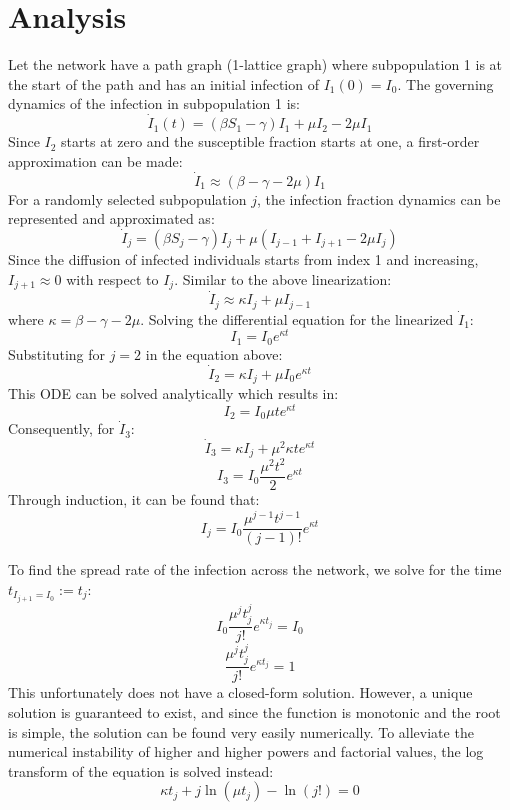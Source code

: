 \section*{Analysis}

\begin{center}
\end{center}

Let the network have a path graph (1-lattice graph) where subpopulation 1 is at the start of the path and has an initial infection of $I_1(0)=I_0$. The governing dynamics of the infection in subpopulation 1 is:
$$
\dot I_1(t)=(\beta S_1-\gamma)I_1+\mu I_2-2\mu I_1
$$
Since $I_2$ starts at zero and the susceptible fraction starts at one, a first-order approximation can be made:
$$
\dot I_1 \approx (\beta-\gamma-2\mu)I_1
$$
For a randomly selected subpopulation $j$, the infection fraction dynamics can be represented and approximated as:
$$
\dot I_j =(\beta S_j-\gamma)I_j+\mu (I_{j-1}+I_{j+1}-2\mu I_j)
$$
Since the diffusion of infected individuals starts from index 1 and increasing, $I_{j+1} \approx 0$ with respect to $I_j$. Similar to the above linearization:
$$
\dot I_j \approx \kappa I_j+\mu I_{j-1}
$$
where $\kappa = \beta-\gamma-2\mu$. Solving the differential equation for the linearized $\dot I_1$:
$$
I_1 = I_0 e^{\kappa t}
$$
Substituting for $j=2$ in the equation above:
$$
\dot I_2=\kappa I_j +\mu I_0 e^{\kappa t}
$$
This ODE can be solved analytically which results in:
$$
I_2=I_0 \mu t e^{\kappa t}  
$$
Consequently, for $\dot I_3$:
$$
\dot I_3=\kappa I_j +\mu^2 \kappa t e^{\kappa t}
$$
$$
I_3 = I_0 \frac{\mu^2 t^2}{2} e^{\kappa t}
$$
Through induction, it can be found that:
$$
I_j=I_0 \frac{\mu^{j-1} t^{j-1}}{(j-1)!} e^{\kappa t}
$$

To find the spread rate of the infection across the network, we solve for the time $t_{I_{j+1}=I_0} :=t_j$:
$$
I_0 \frac{\mu^{j} t_j^{j}}{j!} e^{\kappa t_j} = I_0
$$
$$
\frac{\mu^{j} t_j^{j}}{j!} e^{\kappa t_j} = 1 
$$
This unfortunately does not have a closed-form solution. However, a unique solution is guaranteed to exist, and since the function is monotonic and the root is simple, the solution can be found very easily numerically. To alleviate the numerical instability of higher and higher powers and factorial values, the log transform of the equation is solved instead:
$$
\kappa t_j + j \ln(\mu t_j) - \ln(j!) = 0
$$

